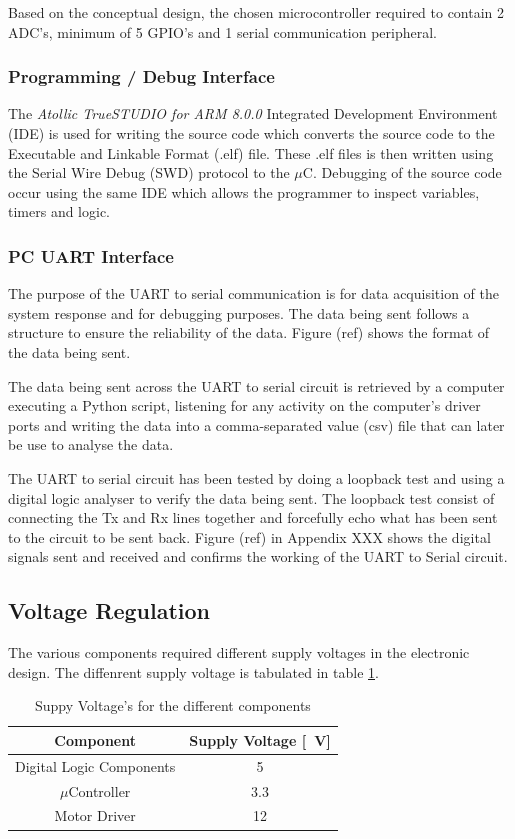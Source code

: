 Based on the conceptual design, the chosen microcontroller required to contain 2 ADC's, minimum of 5 GPIO's and 1 serial communication peripheral.

\subsubsection{Programming / Debug Interface}
The \textit{Atollic TrueSTUDIO for ARM 8.0.0} Integrated Development Environment (IDE) is used for writing the source code which converts the source code to the Executable and Linkable Format (.elf) file. These .elf files is then written using the Serial Wire Debug (SWD) protocol to the $\mu$C. Debugging of the source code occur using the same IDE which allows the programmer to inspect variables, timers and logic.

\subsubsection{PC UART Interface }

The purpose of the UART to serial communication is for data acquisition of the system response and for debugging purposes. The data being sent follows a structure to ensure the reliability of the data. Figure (ref) shows the format of the data being sent.

The data being sent across the UART to serial circuit is retrieved by a computer executing a Python script, listening for any activity on the computer's driver ports and writing the data into a comma-separated value (csv) file that can later be use to analyse the data.


The UART to serial circuit has been tested by doing a loopback test and using a digital logic analyser to verify the data being sent. The loopback test consist of connecting the Tx and Rx lines together and forcefully echo what has been sent to the circuit to be sent back. Figure (ref) in Appendix XXX shows the digital signals sent and received and confirms the working of the UART to Serial circuit. 

\subsection{Voltage Regulation}

The various components required different supply voltages in the electronic design. The diffenrent supply voltage is tabulated in table \ref{table:supplyVoltage}.

\begin{table}[]
	\centering
	\begin{tabular}{|c|c|}
		\hline
		Component & Supply Voltage [\SI{}{V}] \\
		\hline
		\hline
		Digital Logic Components & \SI{5}{} \\
		\hline
		$\mu$Controller & \SI{3.3}{} \\
		\hline
		Motor Driver & \SI{12}{} \\
		\hline
	\end{tabular}
	\caption{Suppy Voltage's for the different components}
	\label{table:supplyVoltage}
\end{table}


